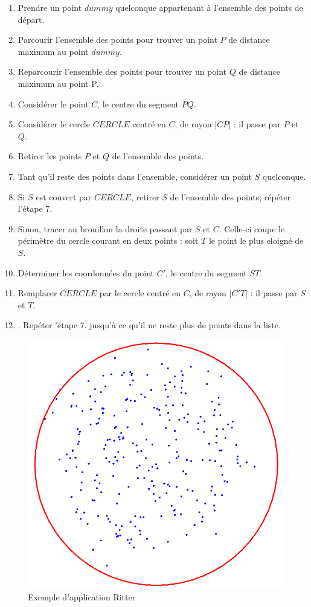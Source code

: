 \begin{enumerate}
\item Prendre un point $dummy$ quelconque appartenant à l'ensemble des points de départ.
\item Parcourir l'ensemble des points pour trouver un point $P$ de distance maximum au point $dummy$.
\item Reparcourir l'ensemble des points pour trouver un point $Q$ de distance maximum au point P.
\item Considérer le point $C$, le centre du segment $PQ$.
\item Considérer le cercle $CERCLE$ centré en $C$, de rayon $\lvert CP \rvert$ : il passe par $P$ et $Q$.
\item Retirer les points $P$ et $Q$ de l'ensemble des points.
\item Tant qu'il reste des points dans l'ensemble, considérer un point $S$ quelconque.
\item Si $S$ est couvert par $CERCLE$, retirer $S$ de l'ensemble des points; répéter l'étape 7.
\item Sinon, tracer au brouillon la droite passant par $S$ et $C$. Celle-ci coupe le périmètre du cercle courant en deux points : soit $T$ le point le plus eloigné de $S$.
\item Déterminer les coordonnées du point $C'$, le centre du segment $ST$.
\item Remplacer $CERCLE$ par le cercle centré en $C$, de rayon $\lvert C'T \rvert$ : il passe par $S$ et $T$.
\item. Repéter 'étape 7. jusqu'à ce qu'il ne reste plus de points dans la liste.
\end{enumerate}

\begin{figure}[ht]
\begin{center}
\includegraphics[scale=0.25]{images/ex_ritter.png}
\caption{Exemple d'application Ritter}
\end{center}
\end{figure}